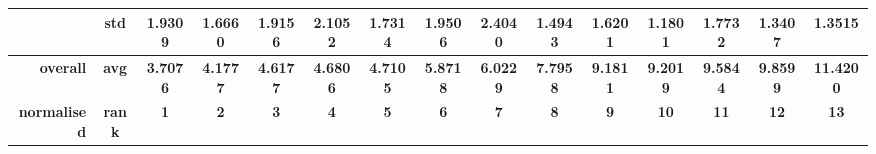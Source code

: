 \begin{table}[htbp]
{\begin{tabular}{rcccc|c|c|c|c|c|ccccc}
			                                                                               & std                                    & 1.9309                                                                             & 1.6660                                                                    & 1.9156                                                                    & 2.1052                                         & 1.7314                                                                    & 1.9506                                       & 2.4040                                      & 1.4943                                         & 1.6201                                         & 1.1801                                          & 1.7732                                          & 1.3407                                         & 1.3515                                         \\
			\midrule
			\textbf{overall}                                                               & \textbf{avg}                           & \cellcolor[rgb]{ .776,  .937,  .808}\textcolor[rgb]{ 0,  .38,  0}{\textbf{3.7076}} & \textbf{4.1777}                                                           & \textbf{4.6177}                                                           & \textbf{4.6806}                                & \textbf{4.7105}                                                           & \textbf{5.8718}                              & \textbf{6.0229}                             & \textbf{7.7958}                                & \textbf{9.1811}                                & \textbf{9.2019}                                 & \textbf{9.5844}                                 & \textbf{9.8599}                                & \textbf{11.4200}                               \\
			\textbf{normalised}                                                            & \textbf{rank}                          & \cellcolor[rgb]{ .388,  .745,  .482}\textbf{1}                                     & \cellcolor[rgb]{ .49,  .773,  .486}\textbf{2}                             & \cellcolor[rgb]{ .592,  .804,  .494}\textbf{3}                            & \cellcolor[rgb]{ .694,  .831,  .498}\textbf{4} & \cellcolor[rgb]{ .796,  .863,  .506}\textbf{5}                            & \cellcolor[rgb]{ .898,  .89,  .51}\textbf{6} & \cellcolor[rgb]{ 1,  .922,  .518}\textbf{7} & \cellcolor[rgb]{ .996,  .839,  .502}\textbf{8} & \cellcolor[rgb]{ .992,  .753,  .486}\textbf{9} & \cellcolor[rgb]{ .988,  .667,  .471}\textbf{10} & \cellcolor[rgb]{ .984,  .584,  .455}\textbf{11} & \cellcolor[rgb]{ .98,  .498,  .439}\textbf{12} & \cellcolor[rgb]{ .973,  .412,  .42}\textbf{13} \\
			\cmidrule{6-6}\cmidrule{8-8}\cmidrule{10-10}\end{tabular}%
	}
\end{table}%

